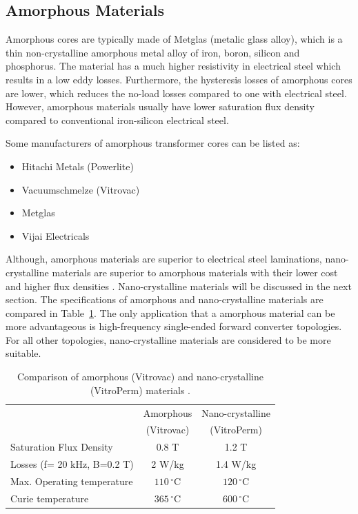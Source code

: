 \documentclass[a4paper, 11pt]{article} %
\begin{document}
\subsection*{Amorphous Materials}

Amorphous cores are typically made of Metglas (metalic glass alloy), which is a thin non-crystalline amorphous metal alloy of iron, boron, silicon and phosphorus. The material has a much higher resistivity in electrical steel which results in a low eddy losses. Furthermore, the hysteresis losses of amorphous cores are lower, which reduces the no-load losses compared to one with electrical steel. However, amorphous materials usually have lower saturation flux density compared to conventional iron-silicon electrical steel.

Some manufacturers of amorphous transformer cores can be listed as:

\begin{itemize}
  \item Hitachi Metals (Powerlite)
  \item Vacuumschmelze (Vitrovac)
  \item Metglas
  \item Vijai Electricals
\end{itemize}

Although, amorphous materials are superior to electrical steel laminations, nano-crystalline materials are superior to amorphous materials with their lower cost and higher flux densities \cite{vitroperm_vitrovac}. Nano-crystalline materials will be discussed in the next section. The specifications of amorphous and nano-crystalline materials are compared in Table~\ref{vitropermvitrovac}. The only  application that a amorphous material can be more advantageous is high-frequency single-ended forward converter topologies. For all other topologies, nano-crystalline materials are considered to be more suitable.

\begin{table}[]
\begin{center}
\begin{tabular}{lcc}
 & Amorphous & Nano-crystalline \\ 
 & (Vitrovac) & (VitroPerm) \\
\hline
Saturation Flux Density & 0.8 T & 1.2 T \\
Losses (f= 20 kHz, B=0.2 T) & 2 W/kg & 1.4 W/kg \\
Max. Operating temperature & $110\,^{\circ}\mathrm{C}$ & $120\,^{\circ}\mathrm{C}$ \\
Curie temperature & $365\,^{\circ}\mathrm{C}$ & $600\,^{\circ}\mathrm{C}$ \\
\hline
\end{tabular} 
\end{center}
\caption{Comparison of amorphous (Vitrovac) and nano-crystalline (VitroPerm) materials \cite{vitroperm_vitrovac}.}
\label{vitropermvitrovac}
\end{table}
\end{document}

